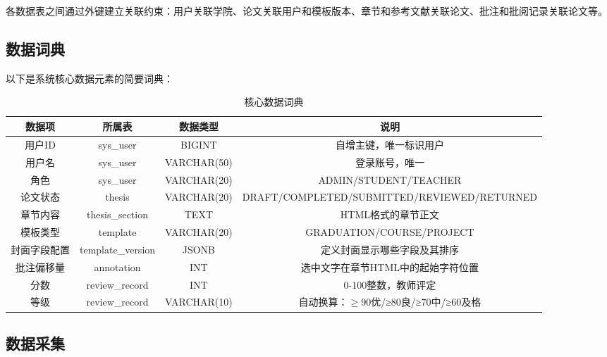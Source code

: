 \documentclass{../../softeng}
\begin{document}
各数据表之间通过外键建立关联约束：用户关联学院、论文关联用户和模板版本、章节和参考文献关联论文、批注和批阅记录关联论文等。

\subsection{数据词典}

以下是系统核心数据元素的简要词典：

\begin{table}[htbp]
    \centering
    \caption{核心数据词典}
    \begin{tabular}{|c|c|c|c|}
        \hline
        \textbf{数据项} & \textbf{所属表} & \textbf{数据类型} & \textbf{说明} \\
        \hline
        用户ID & sys\_user & BIGINT & 自增主键，唯一标识用户 \\
        \hline
        用户名 & sys\_user & VARCHAR(50) & 登录账号，唯一 \\
        \hline
        角色 & sys\_user & VARCHAR(20) & ADMIN/STUDENT/TEACHER \\
        \hline
        论文状态 & thesis & VARCHAR(20) & DRAFT/COMPLETED/SUBMITTED/REVIEWED/RETURNED \\
        \hline
        章节内容 & thesis\_section & TEXT & HTML格式的章节正文 \\
        \hline
        模板类型 & template & VARCHAR(20) & GRADUATION/COURSE/PROJECT \\
        \hline
        封面字段配置 & template\_version & JSONB & 定义封面显示哪些字段及其排序 \\
        \hline
        批注偏移量 & annotation & INT & 选中文字在章节HTML中的起始字符位置 \\
        \hline
        分数 & review\_record & INT & 0-100整数，教师评定 \\
        \hline
        等级 & review\_record & VARCHAR(10) & 自动换算：$\geq$90优/≥80良/≥70中/≥60及格 \\
        \hline
    \end{tabular}
\end{table}

\subsection{数据采集}
\end{document}
